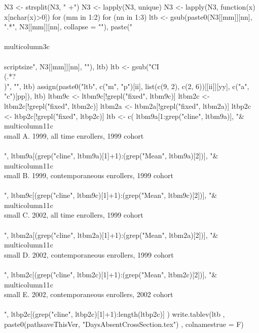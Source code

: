 \begin{Schunk}
\begin{Sinput}
{{{      N3 <- strsplit(N3, " +")
      N3 <- lapply(N3, unique)
      N3 <- lapply(N3, function(x) x[nchar(x)>0])
      for (mm in 1:2)
        for (nn in 1:3)
          ltb <- gsub(paste0(N3[[mm]][nn], ".*", N3[[mm]][nn], collapse = ""), 
            paste("\\\\multicolumn{3}{c}{\\\\scriptsize", N3[[mm]][nn], "}"), ltb)
      ltb <- gsub("CI \\(.*?\\)", "", ltb)
      assign(paste0("ltb", c("m", "p")[ii], list(c(9, 2), c(2, 6))[[ii]][yy], c("a", "c")[pp]), ltb)
    }
  }
}
ltbm9c <- ltbm9c[!grepl("fixed", ltbm9c)]
ltbm2c <- ltbm2c[!grepl("fixed", ltbm2c)]
ltbm2a <- ltbm2a[!grepl("fixed", ltbm2a)]
ltbp2c <- ltbp2c[!grepl("fixed", ltbp2c)]
ltb <- c(
  ltbm9a[1:grep("cline", ltbm9a)],
  "&\\multicolumn{11}{c}{\\small A. 1999, all time enrollers, 1999 cohort}\\\\",
  ltbm9a[(grep("cline", ltbm9a)[1]+1):(grep("Mean", ltbm9a)[2])],
  "&\\multicolumn{11}{c}{\\small B. 1999, contemporaneous enrollers, 1999 cohort}\\\\",
  ltbm9c[(grep("cline", ltbm9c)[1]+1):(grep("Mean", ltbm9c)[2])],
  "&\\multicolumn{11}{c}{\\small C. 2002, all time enrollers, 1999 cohort}\\\\",
  ltbm2a[(grep("cline", ltbm2a)[1]+1):(grep("Mean", ltbm2a)[2])],
  "&\\multicolumn{11}{c}{\\small D. 2002, contemporaneous enrollers, 1999 cohort}\\\\",
  ltbm2c[(grep("cline", ltbm2c)[1]+1):(grep("Mean", ltbm2c)[2])],
  "&\\multicolumn{11}{c}{\\small E. 2002, contemporaneous enrollers, 2002 cohort}\\\\",
  ltbp2c[(grep("cline", ltbp2c)[1]+1):length(ltbp2c)]
)
write.tablev(ltb
  ,  paste0(pathsaveThisVer, "DaysAbsentCrossSection.tex")
  ,  colnamestrue = F)
\end{Sinput}
\end{Schunk}
